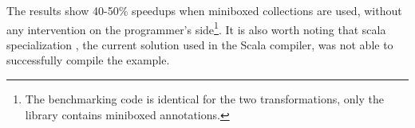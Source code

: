 The results show 40-50\% speedups when miniboxed collections are used, without any intervention on the programmer's side\footnote{The benchmarking code is identical for the two transformations, only the library contains miniboxed annotations.}.
It is also worth noting that scala specialization \cite{iuli-thesis}, the current solution used in the Scala compiler, was not able to successfully compile the example.


